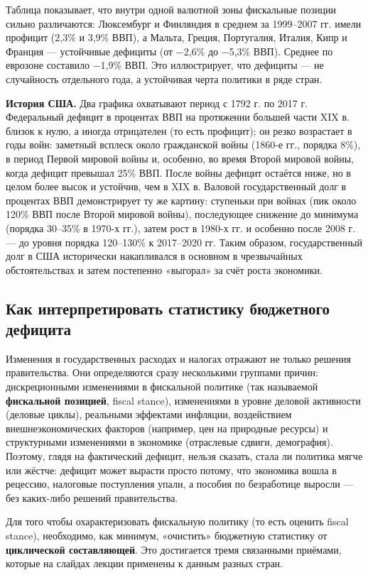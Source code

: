 \documentclass[11pt,a4paper]{article}
\begin{document}
Таблица показывает, что внутри одной валютной зоны фискальные позиции сильно различаются: Люксембург и Финляндия в среднем за 1999--2007 гг. имели профицит (2,3\% и 3,9\% ВВП), а Мальта, Греция, Португалия, Италия, Кипр и Франция --- устойчивые дефициты (от −2,6\% до −5,3\% ВВП). Среднее по еврозоне составило −1,9\% ВВП. Это иллюстрирует, что дефициты --- не случайность отдельного года, а устойчивая черта политики в ряде стран.

\textbf{История США.} Два графика охватывают период с 1792 г. по 2017 г. Федеральный дефицит в процентах ВВП на протяжении большей части XIX в. близок к нулю, а иногда отрицателен (то есть профицит); он резко возрастает в годы войн: заметный всплеск около гражданской войны (1860-е гг., порядка 8\%), в период Первой мировой войны и, особенно, во время Второй мировой войны, когда дефицит превышал 25\% ВВП. После войны дефицит остаётся ниже, но в целом более высок и устойчив, чем в XIX в. Валовой государственный долг в процентах ВВП демонстрирует ту же картину: ступеньки при войнах (пик около 120\% ВВП после Второй мировой войны), последующее снижение до минимума (порядка 30--35\% в 1970-х гг.), затем рост в 1980-х гг. и особенно после 2008 г. --- до уровня порядка 120--130\% к 2017--2020 гг. Таким образом, государственный долг в США исторически накапливался в основном в чрезвычайных обстоятельствах и затем постепенно «выгорал» за счёт роста экономики.

\subsection{Как интерпретировать статистику бюджетного дефицита}

Изменения в государственных расходах и налогах отражают не только решения правительства. Они определяются сразу несколькими группами причин: дискреционными изменениями в фискальной политике (так называемой \textbf{фискальной позицией}, fiscal stance), изменениями в уровне деловой активности (деловые циклы), реальными эффектами инфляции, воздействием внешнеэкономических факторов (например, цен на природные ресурсы) и структурными изменениями в экономике (отраслевые сдвиги, демография). Поэтому, глядя на фактический дефицит, нельзя сказать, стала ли политика мягче или жёстче: дефицит может вырасти просто потому, что экономика вошла в рецессию, налоговые поступления упали, а пособия по безработице выросли --- без каких-либо решений правительства.

Для того чтобы охарактеризовать фискальную политику (то есть оценить fiscal stance), необходимо, как минимум, «очистить» бюджетную статистику от \textbf{циклической составляющей}. Это достигается тремя связанными приёмами, которые на слайдах лекции применены к данным разных стран.
\end{document}
